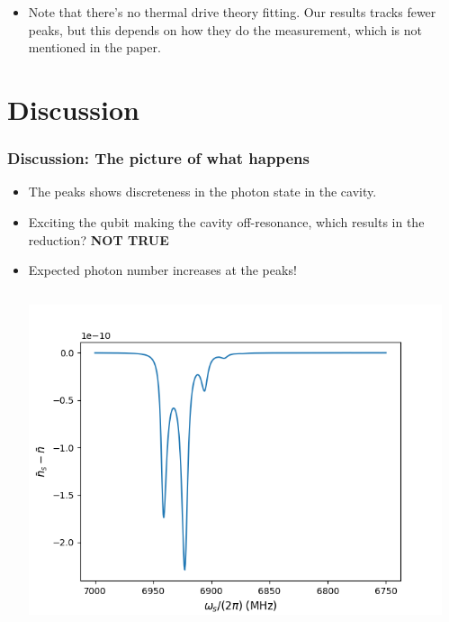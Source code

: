 \documentclass[xcolor=dvipsnames,hyperref={CJKbookmarks=true}]{beamer}
\begin{document}
\begin{frame}[t]
\begin{columns}
\begin{column}{0.6\linewidth}
\end{column}
\end{columns}
\begin{itemize}
	\item Note that there's no thermal drive theory fitting. 
	Our results tracks fewer peaks, but this depends on 
	how they do the measurement, which is not mentioned in the paper. 
\end{itemize}
\end{frame}

\section{Discussion}
\begin{frame}[t]\frametitle{Discussion: The picture of what happens}
\begin{itemize}
	\item The peaks shows discreteness in the photon state in the cavity. 
	\item Exciting the qubit making the cavity off-resonance, which results in
	the reduction? \pause \textbf{\color{red} NOT TRUE} \pause
	\item Expected photon number increases at the peaks!
\begin{columns}
\begin{column}{0.5\linewidth}
    \centering
    \includegraphics[width=\linewidth]{nbar_1.png}
\end{column}%
\begin{column}{0.5\linewidth}
	\centering

\end{column}
\end{columns}
\end{itemize}
\end{frame}
\end{document}
